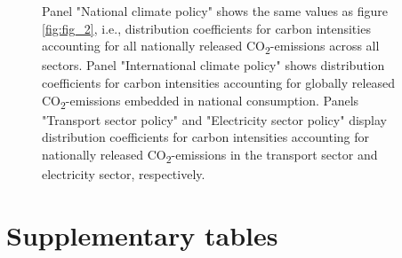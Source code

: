 \documentclass[12pt, a4paper]{article}
\newenvironment{subcaption2}
{\strut
\vspace{-5pt}
\begin{minipage}[b]{0.95\textwidth}
  \hspace*{-\parindent}
  \footnotesize}
 {\end{minipage}}
\begin{document}
\begin{refsection}
\begin{figure}[ht!]
\begin{subcaption2}
    Panel "National climate policy" shows the same values as figure \ref{fig:fig_2}, i.e., distribution coefficients for carbon intensities accounting for all nationally released CO\textsubscript{2}-emissions across all sectors. Panel "International climate policy" shows distribution coefficients for carbon intensities accounting for globally released CO\textsubscript{2}-emissions embedded in national consumption. Panels "Transport sector policy" and "Electricity sector policy" display distribution coefficients for carbon intensities accounting for nationally released CO\textsubscript{2}-emissions in the transport sector and electricity sector, respectively.
    \end{subcaption2}
\end{figure}



\clearpage

\section{Supplementary tables} \label{sec:tables}


\clearpage


\clearpage


\clearpage


\clearpage


\clearpage


\clearpage

%   



\clearpage


\end{refsection}
\end{document}
